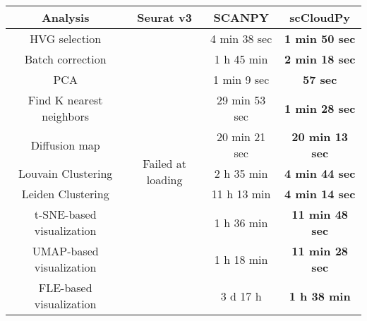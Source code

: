 \documentclass[10pt]{article}
\begin{document}
\begin{table}[H]
	\centering
	\begin{tabular}{|c|c|c|c|}
		\hline
		Analysis  & Seurat v3 & SCANPY & scCloudPy\\
		\hline \hline
		HVG selection  & \multirow{10}{*}{Failed at loading} & 4 min 38 sec  & \textbf{1 min 50 sec}  \\
		\cline{1-1}\cline{3-4}
		Batch correction  & & 1 h 45 min  & \textbf{2 min 18 sec}  \\
		\cline{1-1}\cline{3-4}
		PCA   & & 1 min 9 sec  & \textbf{57 sec}  \\
		\cline{1-1}\cline{3-4}
		Find K nearest neighbors &  & 29 min 53 sec  & \textbf{1 min 28 sec}  \\
		\cline{1-1}\cline{3-4}
		Diffusion map   & & 20 min 21 sec  & \textbf{20 min 13 sec}  \\
		\cline{1-1}\cline{3-4}
		Louvain Clustering &  & 2 h 35 min  & \textbf{4 min 44 sec}  \\
		\cline{1-1}\cline{3-4}
		Leiden Clustering & & 11 h 13 min  & \textbf{4 min 14 sec}  \\
		\cline{1-1}\cline{3-4}
		t-SNE-based visualization  & & 1 h 36 min  & \textbf{11 min 48 sec}  \\
		\cline{1-1}\cline{3-4}
		UMAP-based visualization  & & 1 h 18 min   & \textbf{11 min 28 sec}  \\
		\cline{1-1}\cline{3-4}
		FLE-based visualization   & & 3 d 17 h  & \textbf{1 h 38 min}  \\
		\hline
	\end{tabular}
\end{table}
\end{document}
